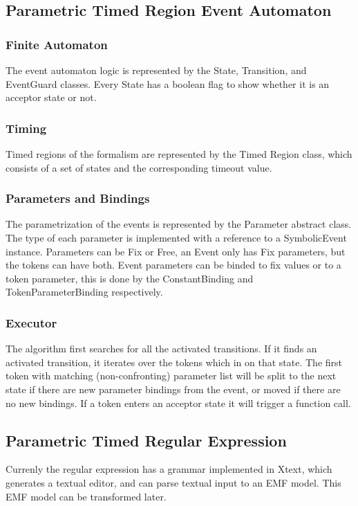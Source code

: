 	\subsection{Parametric Timed Region Event Automaton}
	

	
		\subsubsection{Finite Automaton}
			The event automaton logic is represented by the State, Transition, and EventGuard classes.
			Every State has a boolean flag to show whether it is an acceptor state or not.
		\subsubsection{Timing}
			Timed regions of the formalism are represented by the Timed Region class, which consists of a set of states and the corresponding timeout value.
		\subsubsection{Parameters and Bindings}
			The parametrization of the events is represented by the Parameter abstract class. The type of each parameter is implemented with a reference to a SymbolicEvent instance. Parameters can be Fix or Free, an Event only has Fix parameters, but the tokens can have both. Event parameters can be binded to fix values or to a token parameter, this is done by the ConstantBinding and TokenParameterBinding respectively.
			
		\subsubsection{Executor}
			The algorithm first searches for all the activated transitions.
			If it finds an activated transition, it iterates over the tokens which in on that state. The first token with matching (non-confronting)
			parameter list will be split to the next state if there are new parameter bindings from the event, or moved if there are no new bindings.
			If a token enters an acceptor state it will trigger a function call.

	\subsection{Parametric Timed Regular Expression}

		Currenly the regular expression has a grammar implemented in Xtext, which generates a textual editor, and can parse 
		textual input to an EMF model. This EMF model can be transformed later. 
		

